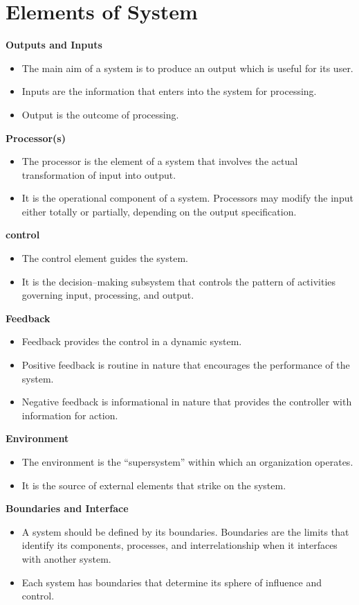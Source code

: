 \documentclass[a4paper,12pt]{report}
\begin{document}
\section{Elements of System}
\textbf{Outputs and Inputs}
\begin{itemize}
	\item 	The main aim of a system is to produce an output which is useful for its user.
	\item 	Inputs are the information that enters into the system for processing.
	\item 	Output is the outcome of processing.
\end{itemize}
\textbf{Processor(s)}
\begin{itemize}
	\item 	The processor is the element of a system that involves the actual transformation of input into output.
	\item 	It is the operational component of a system. Processors may modify the input either totally or partially, depending on the output specification.
\end{itemize}
\textbf{control}
\begin{itemize}
	\item The control element guides the system.
	\item	It is the decision–making subsystem that controls the pattern of activities governing input, processing, and output.
\end{itemize}
\textbf{Feedback}
\begin{itemize}
	\item Feedback provides the control in a dynamic system.
	\item	Positive feedback is routine in nature that encourages the performance of the system.
	\item	Negative feedback is informational in nature that provides the controller with information for action.
\end{itemize}
\textbf{Environment}
\begin{itemize}
	\item	The environment is the “supersystem” within which an organization operates.
	\item	It is the source of external elements that strike on the system.
\end{itemize}
\textbf{Boundaries and Interface}
\begin{itemize}
	\item	A system should be defined by its boundaries. Boundaries are the limits that identify its components, processes, and interrelationship when it interfaces with another system.
	\item	Each system has boundaries that determine its sphere of influence and control.
\end{itemize}
\end{document}
